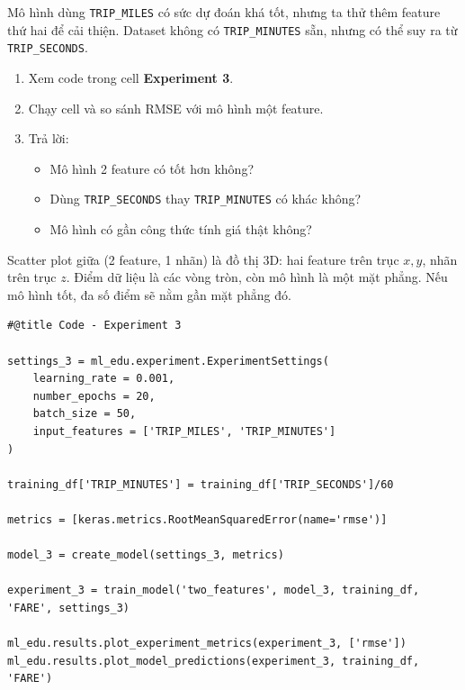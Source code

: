 \documentclass[12pt,a4paper]{article}
\begin{document}
\begin{dongco}[title={Thêm feature có giúp tốt hơn không?}]
Mô hình dùng \texttt{TRIP\_MILES} có sức dự đoán khá tốt, nhưng ta thử thêm feature thứ hai để cải thiện.
Dataset không có \texttt{TRIP\_MINUTES} sẵn, nhưng có thể suy ra từ \texttt{TRIP\_SECONDS}.
\end{dongco}

\begin{phuongphap}[title={Hướng dẫn}]
\begin{enumerate}
  \item Xem code trong cell \textbf{Experiment 3}.
  \item Chạy cell và so sánh RMSE với mô hình một feature.
  \item Trả lời:
  \begin{itemize}
    \item Mô hình 2 feature có tốt hơn không?
    \item Dùng \texttt{TRIP\_SECONDS} thay \texttt{TRIP\_MINUTES} có khác không?
    \item Mô hình có gần công thức tính giá thật không?
  \end{itemize}
\end{enumerate}
\end{phuongphap}

\begin{luuy}[title={Vì sao có đồ thị 3D?}]
Scatter plot giữa (2 feature, 1 nhãn) là đồ thị 3D:
hai feature trên trục \(x,y\), nhãn trên trục \(z\).
Điểm dữ liệu là các vòng tròn, còn mô hình là một mặt phẳng.
Nếu mô hình tốt, đa số điểm sẽ nằm gần mặt phẳng đó.
\end{luuy}

\begin{lstlisting}
#@title Code - Experiment 3

settings_3 = ml_edu.experiment.ExperimentSettings(
    learning_rate = 0.001,
    number_epochs = 20,
    batch_size = 50,
    input_features = ['TRIP_MILES', 'TRIP_MINUTES']
)

training_df['TRIP_MINUTES'] = training_df['TRIP_SECONDS']/60

metrics = [keras.metrics.RootMeanSquaredError(name='rmse')]

model_3 = create_model(settings_3, metrics)

experiment_3 = train_model('two_features', model_3, training_df, 'FARE', settings_3)

ml_edu.results.plot_experiment_metrics(experiment_3, ['rmse'])
ml_edu.results.plot_model_predictions(experiment_3, training_df, 'FARE')
\end{lstlisting}
\end{document}
